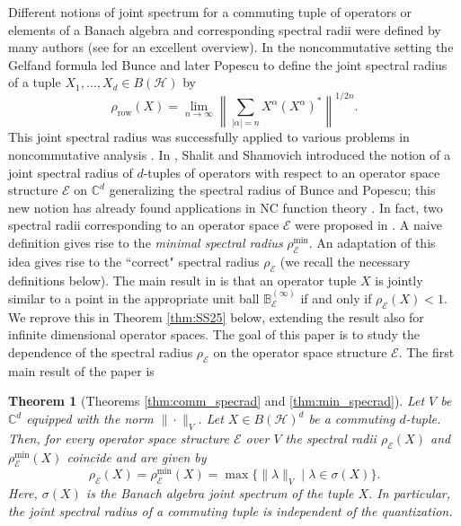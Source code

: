 \documentclass[12pt]{amsart}
\numberwithin{equation}{section}
\newtheorem{thmA}{Theorem}
\theoremstyle{definition}
\newcommand{\cE}{\mathcal{E}}
\newcommand{\cH}{\mathcal{H}}
\newcommand{\bB}{\mathbb{B}}
\newcommand{\C}{\mathbb{C}}
\begin{document}
Different notions of joint spectrum for a commuting tuple of operators or elements of a Banach algebra and corresponding spectral radii were defined by many authors (see \cite{Curto-applications} for an excellent overview). In the noncommutative setting the Gelfand formula led Bunce \cite{Bunce} and later Popescu \cite{Popescu-similarity} to define the joint spectral radius of a tuple $X_1,\ldots,X_d \in B(\cH)$ by
\[
\rho_{\operatorname{row}}(X) = \lim_{n \to \infty} \left\| \sum_{|\alpha| = n} X^{\alpha} (X^{\alpha})^* \right\|^{1/2n}.
\]
This joint spectral radius was successfully applied to various problems in noncommutative analysis \cite{arora2024optimal, augat2025operator, JMS-rat, JMS-clark, Pascoe21, Pop14}. In \cite{shalsham2025spectral}, Shalit and Shamovich introduced the notion of a joint spectral radius of $d$-tuples of operators with respect to an operator space structure $\cE$ on $\C^d$ generalizing the spectral radius of Bunce and Popescu; this new notion has already found applications in NC function theory \cite{sampat2026cyclicity}. In fact, two spectral radii corresponding to an operator space $\cE$ were proposed in \cite{shalsham2025spectral}. 
A naive definition gives rise to the {\em minimal spectral radius} $\rho^{\min}_\cE$. 
An adaptation of this idea gives rise to the ``correct" spectral radius $\rho_{\cE}$ (we recall the necessary definitions below). The main result in \cite{shalsham2025spectral} is that an operator tuple $X$ is jointly similar to a point in the appropriate unit ball $\bB_\cE^{(\infty)}$ if and only if $\rho_\cE(X)<1$. 
We reprove this in Theorem \ref{thm:SS25} below, extending the result also for infinite dimensional operator spaces. The goal of this paper is to study the dependence of the spectral radius $\rho_\cE$ on the operator space structure $\cE$. The first main result of the paper is 
\begin{thmA}[Theorems \ref{thm:comm_specrad} and \ref{thm:min_specrad}]
    Let $V$ be $\C^d$ equipped with the norm $\|\cdot\|_V$. Let $X \in B(\cH)^d$ be a commuting $d$-tuple. Then, for every operator space structure $\cE$ over $V$ the spectral radii $\rho_{\cE}(X)$ and $\rho^{\min}_{\cE}(X)$ coincide and are given by 
    \[
    \rho_{\cE}(X) = \rho^{\min}_{\cE}(X) = \max\{ \|\lambda\|_V \mid \lambda \in \sigma(X) \}.
    \]
    Here, $\sigma(X)$ is the Banach algebra joint spectrum of the tuple $X$. In particular, the joint spectral radius of a commuting tuple is independent of the quantization.
\end{thmA}
\end{document}
